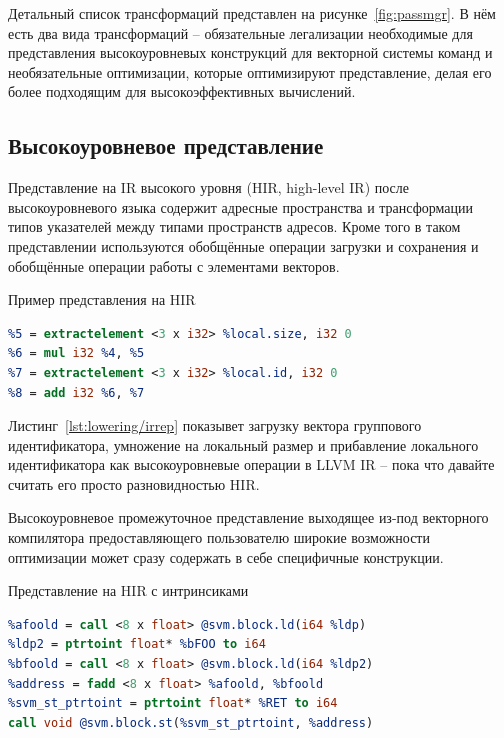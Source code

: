 Детальный список трансформаций представлен на рисунке~\cref{fig:passmgr}. В нём есть два вида трансформаций -- обязательные легализации необходимые для представления высокоуровневых конструкций для векторной системы команд и необязательные оптимизации, которые оптимизируют представление, делая его более подходящим для высокоэффективных вычислений.

\subsection{Высокоуровневое представление}\label{subsec:lowering/passes/highlevel}

Представление на IR высокого уровня (HIR, high-level IR) после высокоуровневого языка содержит адресные пространства и трансформации типов указателей между типами пространств адресов. Кроме того в таком представлении используются обобщённые операции загрузки и сохранения и обобщённые операции работы с элементами векторов.

\begin{ListingEnv}[!h]
    \captiondelim{ }
    \caption{Пример представления на HIR}\label{lst:lowering/irrep}
    \begin{lstlisting}[language=llvm]
%4 = tail call i32 @llvm.genx.group.id.x()
%5 = extractelement <3 x i32> %local.size, i32 0
%6 = mul i32 %4, %5
%7 = extractelement <3 x i32> %local.id, i32 0
%8 = add i32 %6, %7
    \end{lstlisting}
\end{ListingEnv}

Листинг~\cref{lst:lowering/irrep} показывет загрузку вектора группового идентификатора, умножение на локальный размер и прибавление локального идентификатора как высокоуровневые операции в LLVM IR -- пока что давайте считать его просто разновидностью HIR.

Высокоуровневое промежуточное представление выходящее из-под векторного компилятора предоставляющего пользователю широкие возможности оптимизации может сразу содержать в себе специфичные конструкции.

\begin{ListingEnv}[!h]
    \captiondelim{ }
    \caption{Представление на HIR с интринсиками}\label{lst:lowering/intrin}
    \begin{lstlisting}[language=llvm]
%ldp = ptrtoint float* %aFOO to i64
%afoold = call <8 x float> @svm.block.ld(i64 %ldp)
%ldp2 = ptrtoint float* %bFOO to i64
%bfoold = call <8 x float> @svm.block.ld(i64 %ldp2)
%address = fadd <8 x float> %afoold, %bfoold
%svm_st_ptrtoint = ptrtoint float* %RET to i64
call void @svm.block.st(%svm_st_ptrtoint, %address)
    \end{lstlisting}
\end{ListingEnv}

